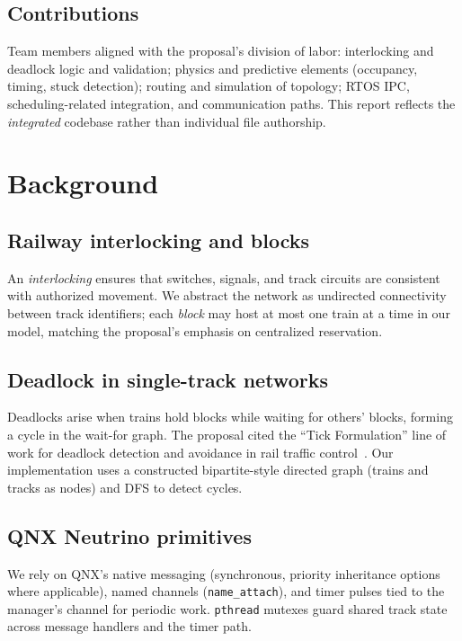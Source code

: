 \documentclass[11pt,a4paper]{article}
\begin{document}
\subsection{Contributions}
Team members aligned with the proposal's division of labor: interlocking and deadlock logic and validation; physics and predictive elements (occupancy, timing, stuck detection); routing and simulation of topology; RTOS IPC, scheduling-related integration, and communication paths. This report reflects the \emph{integrated} codebase rather than individual file authorship.

\section{Background}

\subsection{Railway interlocking and blocks}
An \emph{interlocking} ensures that switches, signals, and track circuits are consistent with authorized movement. We abstract the network as undirected connectivity between track identifiers; each \emph{block} may host at most one train at a time in our model, matching the proposal's emphasis on centralized reservation.

\subsection{Deadlock in single-track networks}
Deadlocks arise when trains hold blocks while waiting for others' blocks, forming a cycle in the wait-for graph. The proposal cited the ``Tick Formulation'' line of work for deadlock detection and avoidance in rail traffic control~\cite{dal2021tick}. Our implementation uses a constructed bipartite-style directed graph (trains and tracks as nodes) and DFS to detect cycles.

\subsection{QNX Neutrino primitives}
We rely on QNX's native messaging (synchronous, priority inheritance options where applicable), named channels (\texttt{name\_attach}), and timer pulses tied to the manager's channel for periodic work. \texttt{pthread} mutexes guard shared track state across message handlers and the timer path.
\end{document}
